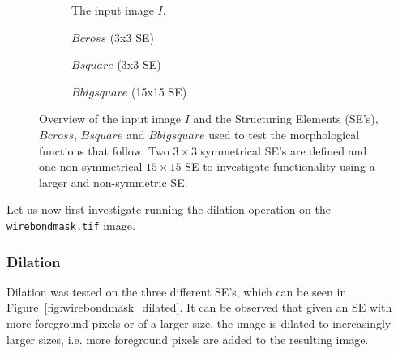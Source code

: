 \documentclass{article}
\begin{document}
\begin{figure}[H]
     \centering
     \begin{subfigure}[b]{0.75\textwidth}
         \centering
         
         \caption{The input image $I$.}
         \label{fig:wirebondmask-image}
     \end{subfigure}
     \newline
     \hfill
     \begin{subfigure}[b]{0.33\textwidth}
         \centering
         
         \caption{$Bcross$ (3x3 SE)}
         \label{fig:Bcross}
     \end{subfigure}
     \hfill
     \begin{subfigure}[b]{0.33\textwidth}
         \centering
         
         \caption{$Bsquare$  (3x3 SE)}
         \label{fig:Bsquare}
     \end{subfigure}
     \hfill
     \begin{subfigure}[b]{0.33\textwidth}
         \centering
         
         \caption{$Bbigsquare$ (15x15 SE)}
         \label{fig:Bbigsquare}
     \end{subfigure}
     
    \caption{Overview of the input image $I$ and the Structuring Elements (SE's), $Bcross$, $Bsquare$ and $Bbigsquare$ used to test the morphological functions that follow. Two $3 \times 3$ symmetrical SE's are defined and one non-symmetrical $15 \times 15$ SE to investigate functionality using a larger and non-symmetric SE.}
    \label{fig:structuring-elements-overview}
\end{figure}

Let us now first investigate running the dilation operation on the \texttt{wirebondmask.tif} image.

\subsubsection*{Dilation}
Dilation was tested on the three different SE's, which can be seen in Figure~\ref{fig:wirebondmask_dilated}. It can be observed that given an SE with more foreground pixels or of a larger size, the image is dilated to increasingly larger sizes, i.e. more foreground pixels are added to the resulting image.
\end{document}
